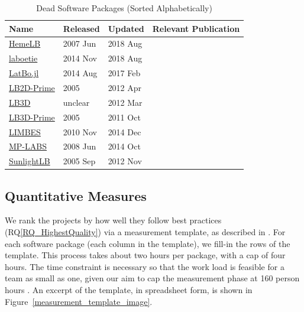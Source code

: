 \documentclass[final, 3p, times, authoryear]{elsarticle}
\newcommand{\rqref}[1]{RQ\ref{#1}}
\begin{document}
\begin{table}[ht!]
	\begin{center}
		\begin{tabular}{ p{3cm}p{2cm}p{2cm}p{5.5cm} }
			\toprule
			Name & Released & Updated & Relevant Publication\\
			\midrule
			\href{https://github.com/UCL/hemelb}{HemeLB} & 2007 Jun & 2018 Aug&\citep{mazzeo2008hemelb}\\
			\href{https://github.com/maxlevesque/laboetie}{laboetie} & 2014 Nov & 2018 Aug&\citep{levesque2013accounting}\\		
			\href{https://github.com/UCL/LatBo.jl}{LatBo.jl} & 2014 Aug & 2017 Feb&\\
			\href{https://code.google.com/p/lb2d-prime-dev/source}{LB2D-Prime} & 2005 & 2012 Apr&\\
			\href{http://ccs.chem.ucl.ac.uk/sites/ccs.chem.ucl.ac.uk/themes/ccs2/files/lb3d-2012-03-12.tgz}{LB3D} & unclear & 2012 Mar&\citep{schmieschek2017lb3d}\\
			\href{https://code.google.com/archive/p/lb3d-prime-dev/source}{LB3D-Prime} & 2005 & 2011 Oct&\\
			\href{https://code.google.com/archive/p/limbes/source}{LIMBES} & 2010 Nov & 2014 Dec&\\
			\href{https://github.com/carlosrosales/mplabs}{MP-LABS} & 2008 Jun & 2014 Oct&\\
			\href{https://sourceforge.net/projects/sunlightlb/files/latest/download}{SunlightLB} & 2005 Sep & 2012 Nov&\\
			\bottomrule
		\end{tabular}
		\caption{Dead Software Packages (Sorted Alphabetically)} \label{deadpackages}
	\end{center}
\end{table}

\subsection{Quantitative Measures} \label{empiricalmeasures}

We rank the projects by how well they follow best practices
(\rqref{RQ_HighestQuality}) via a measurement template, as described in
\citet{SmithEtAl2021}.  For each software package (each column in the template),
we fill-in the rows of the template. This process takes about two hours per
package, with a cap of four hours. The time constraint is necessary so that the
work load is feasible for a team as small as one, given our aim to cap the
measurement phase at 160 person hours \citep{SmithEtAl2021}.  An excerpt of the
template, in spreadsheet form, is shown in
Figure~\ref{measurement_template_image}.
\end{document}
